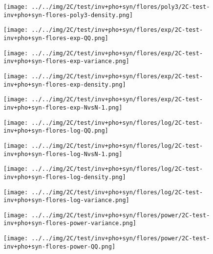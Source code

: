 \begin{figure}[H]
\centering	\texttt{[image: ../../img/2C/test/inv+pho+syn/flores/poly3/2C-test-inv+pho+syn-flores-poly3-density.png]}
\end{figure}
\begin{figure}[H]
\centering	\texttt{[image: ../../img/2C/test/inv+pho+syn/flores/exp/2C-test-inv+pho+syn-flores-exp-QQ.png]}
\end{figure}
\begin{figure}[H]
\centering	\texttt{[image: ../../img/2C/test/inv+pho+syn/flores/exp/2C-test-inv+pho+syn-flores-exp-variance.png]}
\end{figure}
\begin{figure}[H]
\centering	\texttt{[image: ../../img/2C/test/inv+pho+syn/flores/exp/2C-test-inv+pho+syn-flores-exp-density.png]}
\end{figure}
\begin{figure}[H]
\centering	\texttt{[image: ../../img/2C/test/inv+pho+syn/flores/exp/2C-test-inv+pho+syn-flores-exp-NvsN-1.png]}
\end{figure}
\begin{figure}[H]
\centering	\texttt{[image: ../../img/2C/test/inv+pho+syn/flores/log/2C-test-inv+pho+syn-flores-log-QQ.png]}
\end{figure}
\begin{figure}[H]
\centering	\texttt{[image: ../../img/2C/test/inv+pho+syn/flores/log/2C-test-inv+pho+syn-flores-log-NvsN-1.png]}
\end{figure}
\begin{figure}[H]
\centering	\texttt{[image: ../../img/2C/test/inv+pho+syn/flores/log/2C-test-inv+pho+syn-flores-log-density.png]}
\end{figure}
\begin{figure}[H]
\centering	\texttt{[image: ../../img/2C/test/inv+pho+syn/flores/log/2C-test-inv+pho+syn-flores-log-variance.png]}
\end{figure}
\begin{figure}[H]
\centering	\texttt{[image: ../../img/2C/test/inv+pho+syn/flores/power/2C-test-inv+pho+syn-flores-power-variance.png]}
\end{figure}
\begin{figure}[H]
\centering	\texttt{[image: ../../img/2C/test/inv+pho+syn/flores/power/2C-test-inv+pho+syn-flores-power-QQ.png]}
\end{figure}

